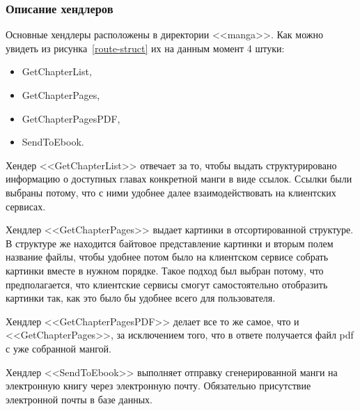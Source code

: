 \subsubsection{Описание хендлеров}
Основные хендлеры расположены в директории <<manga>>. 
Как можно увидеть из рисунка~\ref{route-struct} их на данным момент 4 штуки:
\begin{itemize}
    \item GetChapterList,
    \item GetChapterPages,
    \item GetChapterPagesPDF,
    \item SendToEbook.
\end{itemize}

Хендер <<GetChapterList>> отвечает за то, чтобы выдать структурировано информацию о доступных главах конкретной манги в виде ссылок.
Ссылки были выбраны потому, что с ними удобнее далее взаимодействовать на клиентских сервисах.

Хендлер <<GetChapterPages>> выдает картинки в отсортированной структуре. 
В структуре же находится байтовое представление картинки и вторым полем название файлы, чтобы удобнее потом было на клиентском сервисе собрать картинки вместе в нужном порядке.
Такое подход был выбран потому, что предполагается, что клиентские сервисы смогут самостоятельно отобразить картинки так, как это было бы удобнее всего для пользователя.

Хендлер <<GetChapterPagesPDF>> делает все то же самое, что и <<GetChapterPages>>, за исключением того, что в ответе получается файл pdf с уже собранной мангой.

Хендлер <<SendToEbook>> выполняет отправку сгенерированной манги на электронную книгу через электронную почту.
Обязательно присутствие электронной почты в базе данных.
